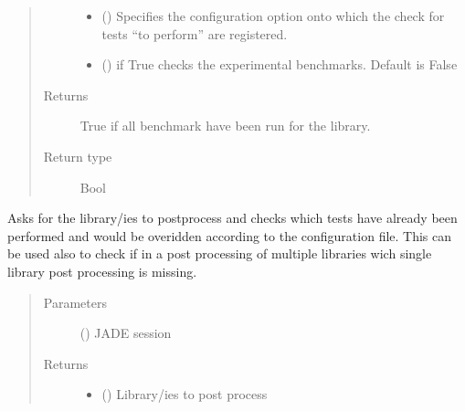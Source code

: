 \documentclass[letterpaper,10pt,english]{sphinxmanual}
\begin{document}
\begin{fulllineitems}
\begin{fulllineitems}
\begin{quote}
\begin{description}
\begin{itemize}
\item {} 
 () \textendash{} Specifies the configuration option onto which the check for tests
“to perform” are registered.

\item {} 
 () \textendash{} if True checks the experimental benchmarks. Default is False

\end{itemize}

\item[{Returns}] \leavevmode
{} \textendash{} True if all benchmark have been run for the library.

\item[{Return type}] \leavevmode
Bool

\end{description}\end{quote}

\end{fulllineitems}


\begin{fulllineitems}
\label{\detokenize{api/initobjects:status.Status.check_override_pp}}
Asks for the library/ies to post\sphinxhyphen{}process and checks which tests have
already been performed and would be overidden according to the
configuration file.
This can be used also to check if in a post processing of multiple
libraries wich single library post processing is missing.
\begin{quote}\begin{description}
\item[{Parameters}] \leavevmode
{} ({\hyperref[\detokenize{api/initobjects:main.Session}]{}}) \textendash{} JADE session

\item[{Returns}] \leavevmode
\begin{itemize}
\item {} 
 () \textendash{} Library/ies to post process


\end{itemize}
\end{description}
\end{quote}
\end{fulllineitems}
\end{fulllineitems}
\end{document}
